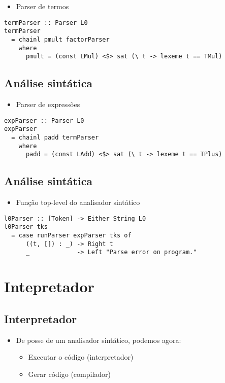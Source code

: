 \documentclass[11pt]{article}
\begin{document}
\begin{itemize}
\item Parser de termos
\end{itemize}

\begin{verbatim}
termParser :: Parser L0 
termParser 
  = chainl pmult factorParser
    where  
      pmult = (const LMul) <$> sat (\ t -> lexeme t == TMul)
\end{verbatim}
\subsection*{Análise sintática}
\label{sec:org4dc19c2}

\begin{itemize}
\item Parser de expressões
\end{itemize}

\begin{verbatim}
expParser :: Parser L0 
expParser 
  = chainl padd termParser
    where 
      padd = (const LAdd) <$> sat (\ t -> lexeme t == TPlus)
\end{verbatim}
\subsection*{Análise sintática}
\label{sec:orgc339211}

\begin{itemize}
\item Função top-level do analisador sintático
\end{itemize}

\begin{verbatim}
l0Parser :: [Token] -> Either String L0 
l0Parser tks 
  = case runParser expParser tks of 
      ((t, []) : _) -> Right t 
      _             -> Left "Parse error on program."
\end{verbatim}
\section*{Intepretador}
\label{sec:orgdfe22cc}

\subsection*{Interpretador}
\label{sec:orgde9cec1}

\begin{itemize}
\item De posse de um analisador sintático, podemos agora:
\begin{itemize}
\item Executar o código (interpretador)
\item Gerar código (compilador)
\end{itemize}
\end{itemize}
\end{document}
